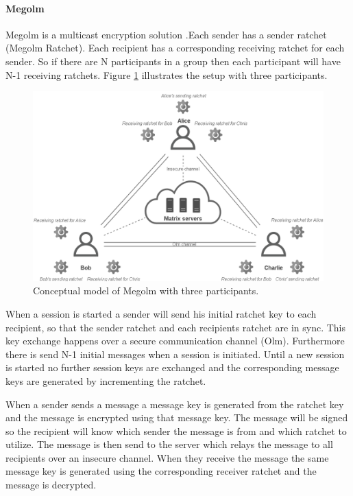 \paragraph{Megolm}

Megolm is a multicast encryption solution \cite{sok}.Each sender has a sender ratchet (Megolm Ratchet). Each recipient has a corresponding receiving ratchet for each sender. So if there are N participants in a group then each participant will have N-1 receiving ratchets. Figure \ref{fig:megolm} illustrates the setup with three participants. 

\begin{figure}[H]
	\hspace*{-1cm} 
	\centering
	\includegraphics[width=14cm]{figures/megolm_conceptual.png}
	\caption{Conceptual model of Megolm with three participants.}
	\label{fig:megolm}
\end{figure}

When a session is started a sender will send his initial ratchet key to each recipient, so that the sender ratchet and each recipients ratchet are in sync. This key exchange happens over a secure communication channel (Olm). Furthermore there is send N-1 initial messages when a session is initiated. Until a new session is started no further session keys are exchanged and the corresponding message keys are generated by incrementing the ratchet.

When a sender sends a message a message key is generated from the ratchet key and the message is encrypted using that message key. The message will be signed so the recipient will know which sender the message is from and which ratchet to utilize. %
The message  is then send to the server which relays the message to all recipients over an insecure channel. When they receive the message the same message key is generated using the corresponding receiver ratchet and the message is decrypted. 

